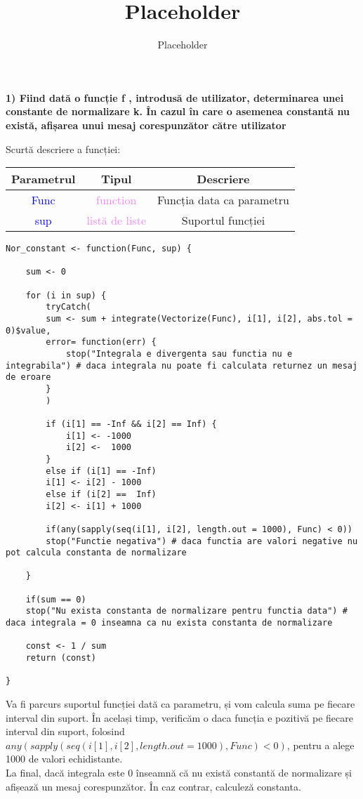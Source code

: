 \documentclass[12pt]{article}
\title{Placeholder}
\author{Placeholder}
\begin{document}
	
\textbf{1) Fiind dată o funcție f , introdusă de utilizator, determinarea unei constante de
	normalizare k. În cazul în care o asemenea constantă nu există, afișarea unui mesaj
	corespunzător către utilizator}\vspace{5mm}

\indent Scurtă descriere a funcției: \\
\begin{center}
	\begin{tabular}{|| c | c | c ||}
		\hline
		Parametrul & Tipul & Descriere \\
		\hline
		\textcolor{blue}{Func} & \textcolor{violet}{function} & Funcția data ca parametru \\
		\hline
		\textcolor{blue}{sup} & \textcolor{violet}{listă de liste} & Suportul funcției \\
		\hline
	\end{tabular}
\end{center}
\begin{lstlisting}
Nor_constant <- function(Func, sup) {
	
	sum <- 0
	
	for (i in sup) {
		tryCatch(
		sum <- sum + integrate(Vectorize(Func), i[1], i[2], abs.tol = 0)$value,
		error= function(err) {
			stop("Integrala e divergenta sau functia nu e integrabila") # daca integrala nu poate fi calculata returnez un mesaj de eroare
		}
		)
		
		if (i[1] == -Inf && i[2] == Inf) {
			i[1] <- -1000
			i[2] <-  1000
		}
		else if (i[1] == -Inf)
		i[1] <- i[2] - 1000
		else if (i[2] ==  Inf)
		i[2] <- i[1] + 1000
		
		if(any(sapply(seq(i[1], i[2], length.out = 1000), Func) < 0))
		stop("Functie negativa") # daca functia are valori negative nu pot calcula constanta de normalizare
		
	}
	
	if(sum == 0)
	stop("Nu exista constanta de normalizare pentru functia data") # daca integrala = 0 inseamna ca nu exista constanta de normalizare
	
	const <- 1 / sum
	return (const)
	
}
\end{lstlisting}

\hfill Va fi parcurs suportul funcției dată ca parametru, și vom calcula suma pe fiecare interval din suport. În același timp, verificăm o daca funcția e pozitivă pe fiecare interval din suport, folosind $any(sapply(seq(i[1], i[2], length.out = 1000), Func) < 0)$, pentru a alege 1000 de valori echidistante.\hfill \\
\indent La final, dacă integrala este 0 înseamnă că nu există constantă de normalizare și afișează un mesaj corespunzător. În caz contrar, calculeză constanta.\hfill \\
\end{document}
